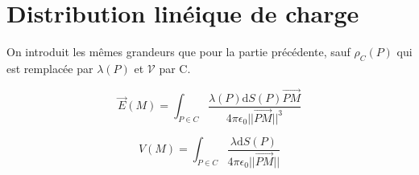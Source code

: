 \documentclass[french]{yLectureNote}
\renewcommand{\vec}{\overrightarrow}
\newcommand{\dd}{\mathrm{d}}
\newcommand{\norm}[1]{||\vec{#1}||}
\newcommand{\E}{\vec{E}(M)}
\newcommand{\er}{\vec{e_{\rho}}}
\newcommand{\ep}{\vec{e_{\varphi}}}
\newcommand{\mv}{\mathcal{V}}
\begin{document}
  \section{Distribution linéique de charge}
On introduit les m\^emes grandeurs que pour la partie précédente, sauf  \(\rho_C(P)\) qui est remplacée par  \(\lambda(P)\) et \(\mv\) par C.

 \begin{theorem}
\[\E = \int_{P\in C} \frac{\lambda(P)\dd S(P)\vec{PM}}{4\pi\epsilon_0 \norm{PM}^3}\]
 \end{theorem}
 \begin{theorem}
\[V(M) = \int_{P\in C} \frac{\lambda \dd S(P)}{4\pi\epsilon_0 \norm{PM}}\]
 \end{theorem}
%
%
%
%
%
%
%
%
%
\end{document}
